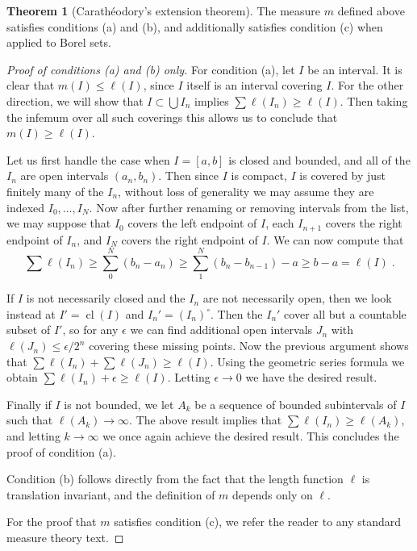\documentclass[11pt,oneside]{amsart}
\DeclareMathOperator{\cl}{cl}
\theoremstyle{definition}
\newtheorem{thm}{Theorem}[section]
\theoremstyle{definition}
\theoremstyle{remark}
\begin{document}
\begin{thm}[Carath\'eodory's extension theorem]
  \label{thm:caratheodory}
  The measure $m$ defined above satisfies conditions (a) and (b), and additionally satisfies condition (c) when applied to Borel sets.
\end{thm}

\begin{proof}[Proof of conditions (a) and (b) only]
  For condition (a), let $I$ be an interval. It is clear that $m(I)\leq\ell(I)$, since $I$ itself is an interval covering $I$. For the other direction, we will show that $I\subset\bigcup I_n$ implies $\sum\ell(I_n)\geq\ell(I)$. Then taking the infemum over all such coverings this allows us to conclude that $m(I)\geq\ell(I)$.

  Let us first handle the case when $I=[a,b]$ is closed and bounded, and all of the $I_n$ are open intervals $(a_n,b_n)$. Then since $I$ is compact, $I$ is covered by just finitely many of the $I_n$, without loss of generality we may assume they are indexed $I_0,\ldots,I_N$. Now after further renaming or removing intervals from the list, we may suppose that $I_0$ covers the left endpoint of $I$, each $I_{n+1}$ covers the right endpoint of $I_n$, and $I_N$ covers the right endpoint of $I$. We can now compute that
\[\sum\ell(I_n)
\geq\sum_0^N(b_n-a_n)
\geq\sum_1^N(b_n-b_{n-1})-a
\geq b-a
= \ell(I)\;.
\]

  If $I$ is not necessarily closed and the $I_n$ are not necessarily open, then we look instead at $I'=\cl(I)$ and $I_n'=(I_n)^\circ$. Then the $I_n'$ cover all but a countable subset of $I'$, so for any $\epsilon$ we can find additional open intervals $J_n$ with $\ell(J_n)\leq\epsilon/2^n$ covering these missing points. Now the previous argument shows that $\sum\ell(I_n)+\sum\ell(J_n)\geq\ell(I)$. Using the geometric series formula we obtain $\sum\ell(I_n)+\epsilon\geq\ell(I)$. Letting $\epsilon\to0$ we have the desired result.

  Finally if $I$ is not bounded, we let $A_k$ be a sequence of bounded subintervals of $I$ such that $\ell(A_k)\to\infty$. The above result implies that $\sum\ell(I_n)\geq\ell(A_k)$, and letting $k\to\infty$ we once again achieve the desired result. This concludes the proof of condition (a).

  Condition (b) follows directly from the fact that the length function $\ell$ is translation invariant, and the definition of $m$ depends only on $\ell$.

  For the proof that $m$ satisfies condition (c), we refer the reader to any standard measure theory text.
\end{proof}
\end{document}
